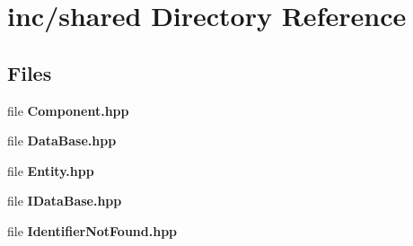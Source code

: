 \section{inc/shared Directory Reference}
\label{dir_ecda0f287c307d056b3c2cb239b6c6d3}
\subsection*{Files}
\begin{DoxyCompactItemize}
\item 
file {\bf Component.\+hpp}
\item 
file {\bf Data\+Base.\+hpp}
\item 
file {\bf Entity.\+hpp}
\item 
file {\bf I\+Data\+Base.\+hpp}
\item 
file {\bf Identifier\+Not\+Found.\+hpp}
\end{DoxyCompactItemize}
